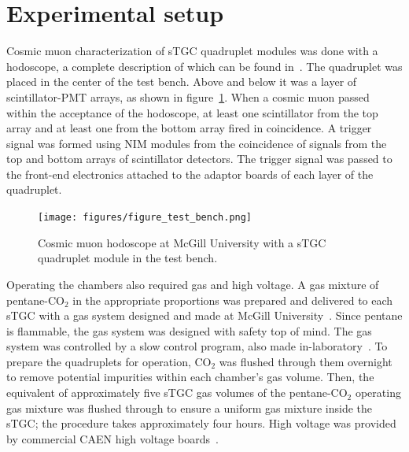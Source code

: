 \section{Experimental setup}

Cosmic muon characterization of sTGC quadruplet modules was done with a hodoscope, a complete description of which can be found in~\cite{lefebvre_thesis}. The quadruplet was placed in the center of the test bench. Above and below it was a layer of scintillator-PMT arrays, as shown in figure~\ref{fig:hodoscope}. When a cosmic muon passed within the acceptance of the hodoscope, at least one scintillator from the top array and at least one from the bottom array fired in coincidence. A trigger signal was formed using NIM modules from the coincidence of signals from the top and bottom arrays of scintillator detectors. The trigger signal was passed to the front-end electronics attached to the adaptor boards of each layer of the quadruplet.

\begin{figure}
    \centering
    \texttt{[image: figures/figure\_test\_bench.png]}
    \caption{Cosmic muon hodoscope at McGill University with a sTGC quadruplet module in the test bench.}
    \label{fig:hodoscope}
\end{figure}

Operating the chambers also required gas and high voltage. A gas mixture of pentane-CO$_{2}$ in the appropriate proportions was prepared and delivered to each sTGC with a gas system designed and made at McGill University~\cite{keyes_development_2017}. Since pentane is flammable, the gas system was designed with safety top of mind. The gas system was controlled by a slow control program, also made in-laboratory~\cite{keyes_development_2017}. To prepare the quadruplets for operation, CO$_{2}$ was flushed through them overnight to remove potential impurities within each chamber's gas volume. Then, the equivalent of approximately five sTGC gas volumes of the pentane-CO$_{2}$ operating gas mixture was flushed through to ensure a uniform gas mixture inside the sTGC; the procedure takes approximately four hours. High voltage was provided by commercial CAEN high voltage boards~\cite{keyes_development_2017}. 


